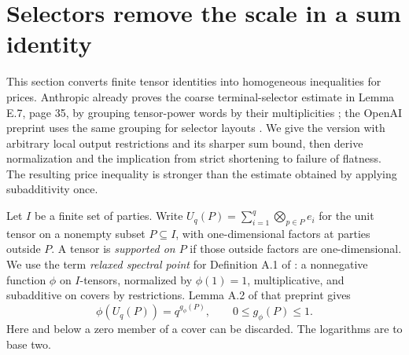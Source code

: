 \section{Selectors remove the scale in a sum identity}\label{sec:selectors}
This section converts finite tensor identities into homogeneous inequalities for prices. Anthropic already proves the coarse terminal-selector estimate in Lemma E.7, page 35, by grouping tensor-power words by their multiplicities \cite{Anthropic2026}; the OpenAI preprint uses the same grouping for selector layouts \cite[Section 2, paragraphs after the definition of strict shortening]{OpenAI2026}. We give the version with arbitrary local output restrictions and its sharper sum bound, then derive normalization and the implication from strict shortening to failure of flatness. The resulting price inequality is stronger than the estimate obtained by applying subadditivity once.

Let $I$ be a finite set of parties. Write $U_q(P)=\sum_{i=1}^q\bigotimes_{p\in P}e_i$ for the unit tensor on a nonempty subset $P\subseteq I$, with one-dimensional factors at parties outside $P$. A tensor is \emph{supported on $P$} if those outside factors are one-dimensional. We use the term \emph{relaxed spectral point} for Definition A.1 of \cite{Anthropic2026}: a nonnegative function $\phi$ on $I$-tensors, normalized by $\phi(1)=1$, multiplicative, and subadditive on covers by restrictions. Lemma A.2 of that preprint gives
\[
 \phi(U_q(P))=q^{g_\phi(P)},\qquad 0\leq g_\phi(P)\leq1.
\]
Here and below a zero member of a cover can be discarded. The logarithms are to base two.

